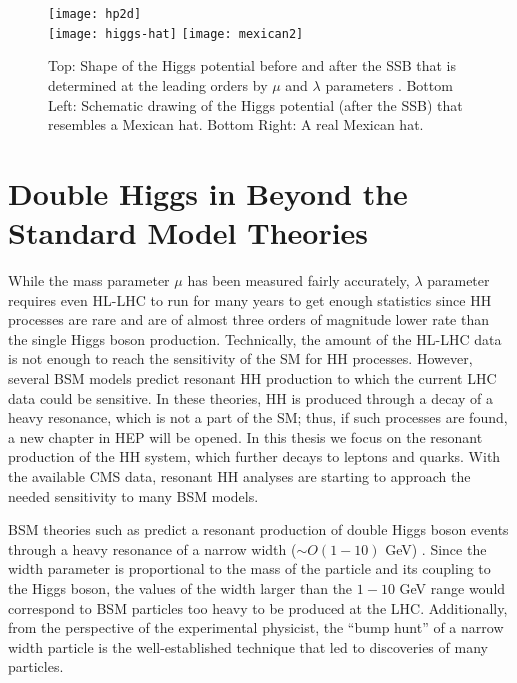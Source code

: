 \begin{figure}[H]
\centering
\texttt{[image: hp2d]}\\
\hspace{1cm} \texttt{[image: higgs-hat]}
\texttt{[image: mexican2]}\\
\caption[SSB Potential form]{Top: Shape of the Higgs potential before and after the SSB that is determined at the leading orders by $\mu$ and $\lambda$ parameters \cite{MonroyMontanez:2639240}. Bottom Left: Schematic drawing of the Higgs potential (after the SSB) that resembles a Mexican hat. Bottom Right: A real Mexican hat.}
\label{hp2d}
\end{figure}


\section{Double Higgs in Beyond the Standard Model Theories}

While the mass parameter $\mu$ has been measured fairly accurately, $\lambda$ parameter requires even HL-LHC to run for many years to get enough statistics since HH processes are rare and are of almost three orders of magnitude lower rate than the single Higgs boson production. Technically, the amount of the HL-LHC data is not enough to reach the sensitivity of the SM for HH processes. However, several BSM models predict resonant HH production to which the current LHC data could be sensitive. In these theories, HH is produced through a decay of a heavy resonance, which is not a part of the SM; thus, if such processes are found, a new chapter in HEP will be opened. In this thesis we focus on the resonant production of the HH system, which further decays to leptons and quarks. With the available CMS data, resonant HH analyses are starting to approach the needed sensitivity to many BSM models. 

BSM theories such as \cite{Huang:2017nnw, Dolan:2012ac, Kanemura:2016tan, Sirunyan:2018iwt, Randall:1999ee, Oliveira:2014kla} predict a resonant production of double Higgs boson events through a heavy resonance of a narrow width ($\sim O(1-10)$ GeV) \cite{Sirunyan:2018iwt}. Since the width parameter is proportional to the mass of the particle and its coupling to the Higgs boson, the values of the width larger than the $1-10$ GeV  range would correspond to BSM particles too heavy to be produced at the LHC. Additionally, from the perspective of the experimental physicist, the ``bump hunt'' of a narrow width particle is the well-established technique that led to discoveries of many particles. 


